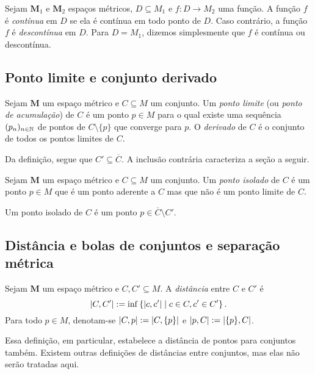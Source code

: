 \begin{definition}
Sejam $\bm M_1$ e $\bm M_2$ espaços métricos, $D \subseteq M_1$ e $f: D \to M_2$ uma função. A função $f$ é \emph{contínua} em $D$ se ela é contínua em todo ponto de $D$. Caso contrário, a função $f$ é \emph{descontínua} em $D$. Para $D=M_1$, dizemos simplesmente que $f$ é contínua ou descontínua.
\end{definition}

\subsection{Ponto limite e conjunto derivado}

\begin{definition}
Sejam $\bm M$ um espaço métrico e $C \subseteq M$ um conjunto. Um \emph{ponto limite} (ou \emph{ponto de acumulação}) de $C$ é um ponto $p \in M$ para o qual existe uma sequência $(p_n)_{n \in \mathbb{N}}$ de pontos de $C \setminus \{p\}$ que converge para $p$. O \emph{derivado} de $C$ é o conjunto de todos os pontos limites de $C$. 
\end{definition}

Da definição, segue que $C' \subseteq \overline C$. A inclusão contrária caracteriza a seção a seguir.

\begin{definition}
Sejam $\bm M$ um espaço métrico e $C \subseteq M$ um conjunto. Um \emph{ponto isolado} de $C$ é um ponto $p \in M$ que é um ponto aderente a $C$ mas que não é um ponto limite de $C$.
\end{definition}

Um ponto isolado de $C$ é um ponto $p \in \overline C \setminus C'$.

\subsection{Distância e bolas de conjuntos e separação métrica}

\begin{definition}
Sejam $\bm M$ um espaço métrico e $C,C' \subseteq M$. A \emph{distância} entre $C$ e $C'$ é
	\begin{equation*}
	\left\vert{C},{C'}\right\vert := \inf \left\{{\left\vert{c},{c'}\right\vert}\;\middle\vert\;{c \in C, c' \in C'}\right\}.
	\end{equation*}
Para todo $p \in M$, denotam-se $\left\vert{C},{p}\right\vert := \left\vert{C},{\{p\}}\right\vert$ e $\left\vert{p},{C}\right\vert := \left\vert{\{p\}},{C}\right\vert$.
\end{definition}

Essa definição, em particular, estabelece a distância de pontos para conjuntos também. Existem outras definições de distâncias entre conjuntos, mas elas não serão tratadas aqui.

